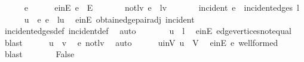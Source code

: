 \begin{isabellebody}
\isanewline
\ \ \ \ \isamarkupfalse%
\ e\isanewline
\ \ \ \ \isamarkupfalse%
\ e{\isacharunderscore}{\kern0pt}in{\isacharunderscore}{\kern0pt}E{\isacharcolon}{\kern0pt}\ {\isachardoublequoteopen}e\ {\isasymin}\ E{\isachardoublequoteclose}\isanewline
\ \ \ \ \ \ \ not{\isacharunderscore}{\kern0pt}lv{\isacharcolon}{\kern0pt}\ {\isachardoublequoteopen}e\ {\isasymnoteq}\ {\isacharbraceleft}{\kern0pt}l{\isacharcomma}{\kern0pt}v{\isacharbraceright}{\kern0pt}{\isachardoublequoteclose}\isanewline
\ \ \ \ \ \ \ incident{\isacharcolon}{\kern0pt}\ {\isachardoublequoteopen}e\ {\isasymin}\ incident{\isacharunderscore}{\kern0pt}edges\ l{\isachardoublequoteclose}\isanewline
\ \ \ \ \isamarkupfalse%
\ u\ \ e{\isacharcolon}{\kern0pt}\ {\isachardoublequoteopen}e\ {\isacharequal}{\kern0pt}\ {\isacharbraceleft}{\kern0pt}l{\isacharcomma}{\kern0pt}u{\isacharbraceright}{\kern0pt}{\isachardoublequoteclose}\ \isamarkupfalse%
\ e{\isacharunderscore}{\kern0pt}in{\isacharunderscore}{\kern0pt}E\ obtain{\isacharunderscore}{\kern0pt}edge{\isacharunderscore}{\kern0pt}pair{\isacharunderscore}{\kern0pt}adj\ incident\isanewline
\ \ \ \ \ \ \isamarkupfalse%
\ incident{\isacharunderscore}{\kern0pt}edges{\isacharunderscore}{\kern0pt}def\ incident{\isacharunderscore}{\kern0pt}def\ \isamarkupfalse%
\ auto\isanewline
\ \ \ \ \isamarkupfalse%
\ \isamarkupfalse%
\ {\isachardoublequoteopen}u\ {\isasymnoteq}\ l{\isachardoublequoteclose}\ \isamarkupfalse%
\ e{\isacharunderscore}{\kern0pt}in{\isacharunderscore}{\kern0pt}E\ edge{\isacharunderscore}{\kern0pt}vertices{\isacharunderscore}{\kern0pt}not{\isacharunderscore}{\kern0pt}equal\ \isamarkupfalse%
\ blast\isanewline
\ \ \ \ \isamarkupfalse%
\ {\isachardoublequoteopen}u\ {\isasymnoteq}\ v{\isachardoublequoteclose}\ \isamarkupfalse%
\ e\ not{\isacharunderscore}{\kern0pt}lv\ \isamarkupfalse%
\ auto\isanewline
\ \ \ \ \isamarkupfalse%
\ u{\isacharunderscore}{\kern0pt}in{\isacharunderscore}{\kern0pt}V{\isacharcolon}{\kern0pt}\ {\isachardoublequoteopen}u\ {\isasymin}\ V{\isachardoublequoteclose}\ \isamarkupfalse%
\ e{\isacharunderscore}{\kern0pt}in{\isacharunderscore}{\kern0pt}E\ e\ wellformed\ \isamarkupfalse%
\ blast\isanewline
\ \ \ \ \isamarkupfalse%
\ \isamarkupfalse%
\ False\isanewline
\ \ \ \ \isamarkupfalse%

\end{isabellebody}
